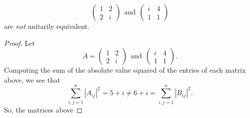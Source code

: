 \begin{enumerate}
        \[  \begin{pmatrix} 
            1 & 2 \\
            2 & i 
        \end{pmatrix} \ \ \text{and} \ \ \begin{pmatrix} 
            i & 4 \\
            1 & 1 
                  \end{pmatrix} \]
                  are \textit{not} unitarily equivalent.
            \begin{proof}
            Let 
            \[  A = \begin{pmatrix} 
                1 & 2 \\
                2 & i 
            \end{pmatrix}  \ \ \text{and} \ \ \begin{pmatrix}
                i & 4 \\
                1 & 1 
            \end{pmatrix}. \]
            Computing the sum of the absolute value squared of the entries of each matrix above, we see that
            \[  \sum_{ i,j = 1  }^{ n } | {A}_{ij} |^{2} = 5 + i \neq 6 + i = \sum_{ i,j = 1  }^{ n  } | {B}_{ij} |^{2}. \]
            So, the matrices above 
            \end{proof}
\end{enumerate}

